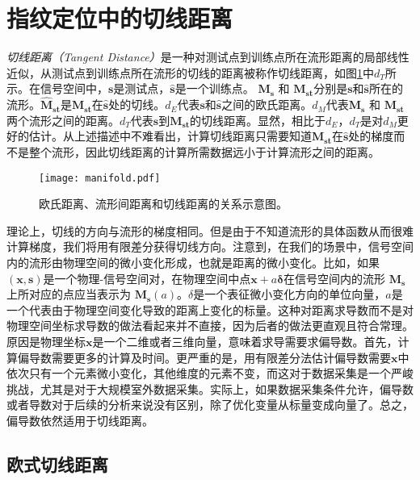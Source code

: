 \section{指纹定位中的切线距离}

\textit{切线距离（Tangent Distance）}是一种对测试点到训练点所在流形距离的局部线性近似，从测试点到训练点所在流形的切线的距离被称作切线距离，如图\ref{fig:manifold}中$d_T$所示。在信号空间中，$\mathbf{s}$是测试点，$\widehat{\mathbf{s}}$是一个训练点。 $\boldsymbol{M_s}$ 和 $\boldsymbol{M_{st}}$分别是$\mathbf{s}$和$\widehat{\mathbf{s}}$所在的流形。$\boldsymbol{\widehat{M}_{st}}$是$\boldsymbol{M_{st}}$在$\widehat{\mathbf{s}}$处的切线。$d_E$代表$\mathbf{s}$和$\widehat{\mathbf{s}}$之间的欧氏距离。$d_M$代表$\boldsymbol{M_s}$ 和 $\boldsymbol{M_{st}}$两个流形之间的距离。$d_T$代表$\mathbf{s}$到$\boldsymbol{M_{st}}$的切线距离。显然，相比于$d_E$，$d_T$是对$d_M$更好的估计。从上述描述中不难看出，计算切线距离只需要知道$\boldsymbol{M_{st}}$在$\widehat{\mathbf{s}}$处的梯度而不是整个流形，因此切线距离的计算所需数据远小于计算流形之间的距离。

\begin{figure}[htb]
	\centering
	\texttt{[image: manifold.pdf]}
	\caption{欧氏距离、流形间距离和切线距离的关系示意图。}
	\label{fig:manifold}
\end{figure}

理论上，切线的方向与流形的梯度相同。但是由于不知道流形的具体函数从而很难计算梯度，我们将用有限差分获得切线方向。注意到，在我们的场景中，信号空间内的流形由物理空间的微小变化形成，也就是距离的微小变化。比如，如果$(\mathbf{x}, \mathbf{s})$是一个物理-信号空间对，在物理空间中点$\mathbf{x} + a{\bm{\delta}}$在信号空间内的流形 $\boldsymbol{M_s}$上所对应的点应当表示为 $\boldsymbol{M_s}(a)$。$\delta$是一个表征微小变化方向的单位向量，$a$是一个代表由于物理空间变化导致的距离上变化的标量。这种对距离求导数而不是对物理空间坐标求导数的做法看起来并不直接，因为后者的做法更直观且符合常理。原因是物理坐标$\mathbf{x}$是一个二维或者三维向量，意味着求导需要求偏导数。首先，计算偏导数需要更多的计算及时间。更严重的是，用有限差分法估计偏导数需要$\mathbf{x}$中依次只有一个元素微小变化，其他维度的元素不变，而这对于数据采集是一个严峻挑战，尤其是对于大规模室外数据采集。实际上，如果数据采集条件允许，偏导数或者导数对于后续的分析来说没有区别，除了优化变量从标量变成向量了。总之，偏导数依然适用于切线距离。

\subsection{欧式切线距离}

